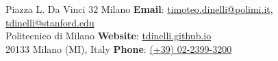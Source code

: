 Piazza L. Da Vinci 32 Milano \hfill \textbf{Email}:
\href{mailto:timoteo.dinelli@polimi.it}{timoteo.dinelli@polimi.it},
\href{mailto:tdinelli@stanford.edu}{tdinelli@stanford.edu}\\
Politecnico di Milano   \hfill \textbf{Website}:
\href{https://tdinelli.github.io}{tdinelli.github.io}\\
20133 Milano (MI), Italy  \hfill \textbf{Phone}: \href{tel:+390223993200}{(+39)
02-2399-3200}\\
